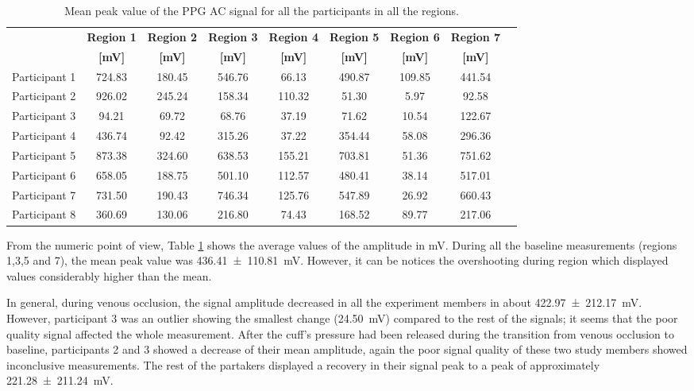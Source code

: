 \begin{table}[!htbp]
	\caption[Mean peak value of the PPG AC signal for all participants in all regions]{Mean peak value of the PPG AC signal for all the participants in all the regions.}
	\label{tbl:PPG RED-AC}
	\centering \small
	\begin{tabular}{p{1.9cm}cccccccc}
		\toprule
		& \textbf{Region 1}
		& \textbf{Region 2}
		& \textbf{Region 3}
		& \textbf{Region 4}
		& \textbf{Region 5}
		& \textbf{Region 6}
		& \textbf{Region 7} \\
		& \textbf{[\si{\milli\volt}]}
		& \textbf{[\si{\milli\volt}]}
		& \textbf{[\si{\milli\volt}]}		
		& \textbf{[\si{\milli\volt}]}		
		& \textbf{[\si{\milli\volt}]}
		& \textbf{[\si{\milli\volt}]}
		& \textbf{[\si{\milli\volt}]}\\\midrule
		Participant 1 & 724.83 & 180.45 & 546.76 &  66.13 & 490.87 & 109.85 & 441.54   \\  
		Participant 2 & 926.02 & 245.24 & 158.34 & 110.32 &  51.30 &   5.97 &  92.58   \\  
		Participant 3 &  94.21 &  69.72 &  68.76 &  37.19 &  71.62 &  10.54 & 122.67   \\  
		Participant 4 & 436.74 &  92.42 & 315.26 &  37.22 & 354.44 &  58.08 & 296.36   \\  
		Participant 5 & 873.38 & 324.60 & 638.53 & 155.21 & 703.81 &  51.36 & 751.62   \\  
		Participant 6 & 658.05 & 188.75 & 501.10 & 112.57 & 480.41 &  38.14 & 517.01   \\  
		Participant 7 & 731.50 & 190.43 & 746.34 & 125.76 & 547.89 &  26.92 & 660.43   \\  
		Participant 8 & 360.69 & 130.06 & 216.80 &  74.43 & 168.52 &  89.77 & 217.06   \\ 
		\bottomrule
	\end{tabular}
\end{table}

From the numeric point of view, Table \ref{tbl:PPG RED-AC} shows the average values of the amplitude in \si{\milli\volt}. During all the baseline measurements (regions 1,3,5 and 7), the mean peak value was \SI{436.41(11081)}{\milli\volt}. However, it can be notices the overshooting during region which displayed values considerably higher than the mean.  

In general, during venous occlusion, the signal amplitude decreased in all the experiment members in about \SI{422.97(21217)}{\milli\volt}. However, participant 3 was an outlier showing the smallest change (\SI{24.50}{\milli\volt}) compared to the rest of the signals; it seems that the poor quality signal affected the whole measurement. After the cuff's pressure had been released during the transition from venous occlusion to baseline, participants 2 and 3 showed a decrease of their mean amplitude, again the poor signal quality of these two study members showed inconclusive measurements. The rest of the partakers displayed a recovery in their signal peak to a peak of approximately \SI{221.28(21124)}{\milli\volt}. 

